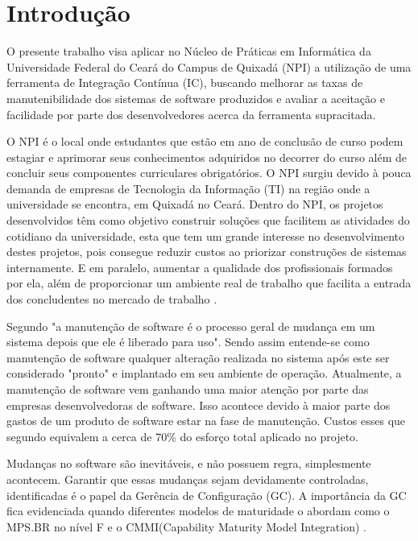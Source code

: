 \chapter{Introdução}

O presente trabalho visa aplicar no Núcleo de Práticas em Informática da Universidade Federal do Ceará do Campus de Quixadá (NPI) a utilização de uma ferramenta de Integração Contínua (IC), buscando melhorar as taxas de manutenibilidade dos sistemas de software produzidos e avaliar a aceitação e facilidade por parte dos desenvolvedores acerca da ferramenta supracitada.

O NPI é o local onde estudantes que estão em ano de conclusão de curso podem estagiar e aprimorar seus conhecimentos adquiridos no decorrer do curso além de concluir seus componentes curriculares obrigatórios. O NPI surgiu devido à pouca demanda de empresas de Tecnologia da Informação (TI) na região onde a universidade se encontra, em Quixadá no Ceará. Dentro do NPI, os projetos desenvolvidos têm como objetivo construir soluções que facilitem as atividades do cotidiano da universidade, esta que tem um grande interesse no desenvolvimento destes projetos, pois consegue reduzir custos ao priorizar construções de sistemas internamente. E em paralelo, aumentar a qualidade dos profissionais formados por ela, além de proporcionar um ambiente real de trabalho que facilita a entrada dos concludentes no mercado de trabalho \cite{npi2013}.

Segundo  "a manutenção de software é o processo geral de mudança em um sistema depois que ele é liberado para uso". Sendo assim entende-se como manutenção de software  qualquer alteração realizada no sistema após este ser considerado "pronto" e implantado em seu ambiente de operação. Atualmente, a manutenção de software vem ganhando uma maior atenção por parte das empresas desenvolvedoras de software. Isso acontece devido à maior parte dos gastos de um produto de software estar na fase de manutenção. Custos esses que segundo  equivalem a  cerca de 70\% do esforço total aplicado no projeto.

Mudanças no software são inevitáveis, e não possuem regra, simplesmente acontecem. Garantir que essas mudanças sejam devidamente controladas, identificadas é o papel da  Gerência de Configuração (GC). A importância da GC fica evidenciada quando diferentes modelos de maturidade o abordam como o MPS.BR no nível F e o CMMI(Capability Maturity Model Integration) \cite{furlaneto2006}.

